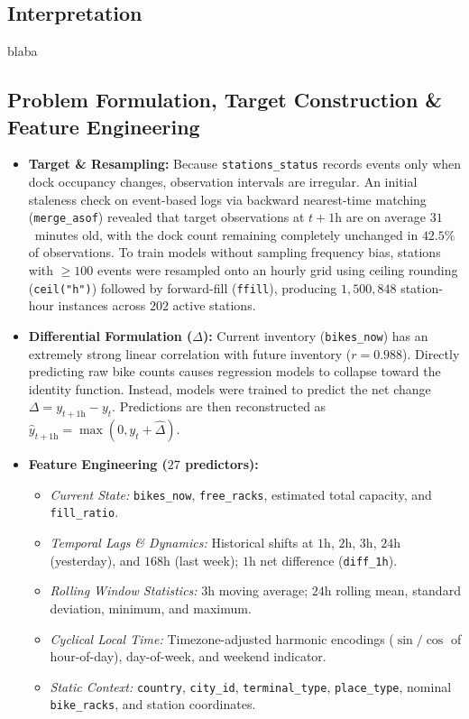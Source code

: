 \documentclass[11pt,a4paper,english]{article}
\begin{document}
\subsection{Interpretation}
blaba

\subsection{Problem Formulation, Target Construction \& Feature Engineering}

\begin{itemize}[leftmargin=*,noitemsep,topsep=2pt]
    \item \textbf{Target \& Resampling:} Because \texttt{stations\_status} records events only when dock occupancy changes, observation intervals are irregular. An initial staleness check on event-based logs via backward nearest-time matching (\texttt{merge\_asof}) revealed that target observations at $t+1\text{h}$ are on average $31$~minutes old, with the dock count remaining completely unchanged in $42.5\%$ of observations. To train models without sampling frequency bias, stations with $\ge 100$ events were resampled onto an hourly grid using ceiling rounding (\texttt{ceil("h")}) followed by forward-fill (\texttt{ffill}), producing $1{,}500{,}848$ station-hour instances across $202$ active stations.

    \item \textbf{Differential Formulation ($\Delta$):} Current inventory (\texttt{bikes\_now}) has an extremely strong linear correlation with future inventory ($r = 0.988$). Directly predicting raw bike counts causes regression models to collapse toward the identity function. Instead, models were trained to predict the net change $\Delta = y_{t+1\text{h}} - y_t$. Predictions are then reconstructed as $\hat{y}_{t+1\text{h}} = \max(0, y_t + \hat{\Delta})$.

    \item \textbf{Feature Engineering ($27$ predictors):}
    \begin{itemize}[leftmargin=*,noitemsep]
        \item \textit{Current State:} \texttt{bikes\_now}, \texttt{free\_racks}, estimated total capacity, and \texttt{fill\_ratio}.
        \item \textit{Temporal Lags \& Dynamics:} Historical shifts at $1\text{h}$, $2\text{h}$, $3\text{h}$, $24\text{h}$ (yesterday), and $168\text{h}$ (last week); $1\text{h}$ net difference (\texttt{diff\_1h}).
        \item \textit{Rolling Window Statistics:} $3\text{h}$ moving average; $24\text{h}$ rolling mean, standard deviation, minimum, and maximum.
        \item \textit{Cyclical Local Time:} Timezone-adjusted harmonic encodings ($\sin/\cos$ of hour-of-day), day-of-week, and weekend indicator.
        \item \textit{Static Context:} \texttt{country}, \texttt{city\_id}, \texttt{terminal\_type}, \texttt{place\_type}, nominal \texttt{bike\_racks}, and station coordinates.
    \end{itemize}
\end{itemize}
\end{document}
